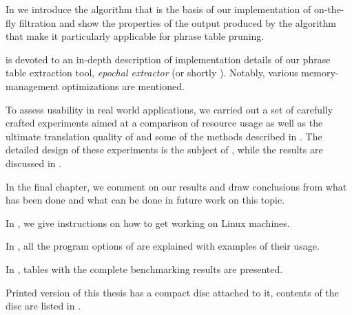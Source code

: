 In  we introduce the algorithm that is the basis of our implementation
of on-the-fly filtration and show the properties of the output produced
by the algorithm that make it particularly applicable for phrase table pruning.

 is devoted to an in-depth description of implementation details of our
phrase table extraction tool, \emph{epochal extractor} (or shortly \eppex{}).
Notably, various memory-management optimizations are mentioned.

To assess \eppex{} usability in real world applications, we carried out a set
of carefully crafted experiments aimed at a comparison of resource usage as well as
the ultimate translation quality of \eppex{} and some of the methods described
in .
The detailed design of these experiments is the subject of ,
while the results are discussed in .

In the final chapter, we comment on our results and draw conclusions from
what has been done and what can be done in future work on this topic.

In , we give instructions on how to get \eppex{} working on Linux machines.

In , all the program options of \eppex{} are explained with examples of their usage.

In , tables with the complete benchmarking results are presented.

Printed version of this thesis has a compact disc attached to it, contents of the disc are listed in .
